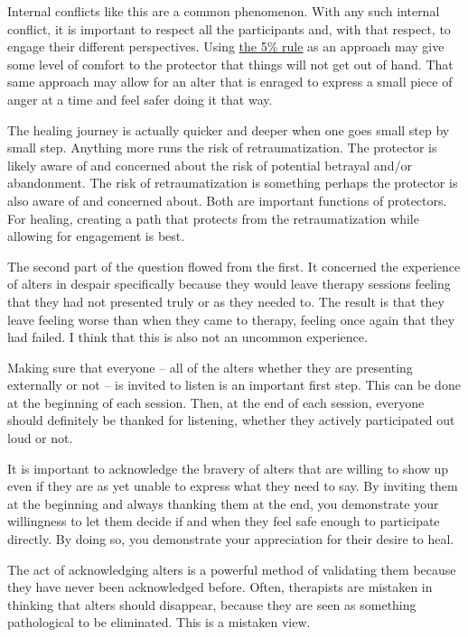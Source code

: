 \documentclass[]{book}
\begin{document}
Internal conflicts like this are a common phenomenon. With any such internal conflict, it is important to respect all the participants and, with that respect, to engage their different perspectives. Using \href{https://www.engagingmultiples.com/the-5-rule/}{the 5\% rule} as an approach may give some level of comfort to the protector that things will not get out of hand. That same approach may allow for an alter that is enraged to express a small piece of anger at a time and feel safer doing it that way.

The healing journey is actually quicker and deeper when one goes small step by small step. Anything more runs the risk of retraumatization. The protector is likely aware of and concerned about the risk of potential betrayal and/or abandonment. The risk of retraumatization is something perhaps the protector is also aware of and concerned about. Both are important functions of protectors. For healing, creating a path that protects from the retraumatization while allowing for engagement is best.

The second part of the question flowed from the first. It concerned the experience of alters in despair specifically because they would leave therapy sessions feeling that they had not presented truly or as they needed to. The result is that they leave feeling worse than when they came to therapy, feeling once again that they had failed. I think that this is also not an uncommon experience.

Making sure that everyone -- all of the alters whether they are presenting externally or not -- is invited to listen is an important first step. This can be done at the beginning of each session. Then, at the end of each session, everyone should definitely be thanked for listening, whether they actively participated out loud or not.

It is important to acknowledge the bravery of alters that are willing to show up even if they are as yet unable to express what they need to say. By inviting them at the beginning and always thanking them at the end, you demonstrate your willingness to let them decide if and when they feel safe enough to participate directly. By doing so, you demonstrate your appreciation for their desire to heal.

The act of acknowledging alters is a powerful method of validating them because they have never been acknowledged before. Often, therapists are mistaken in thinking that alters should disappear, because they are seen as something pathological to be eliminated. This is a mistaken view.
\end{document}
